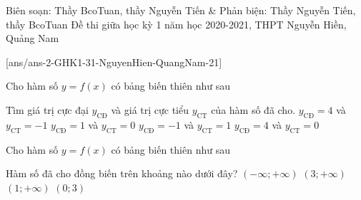 \begin{name}
	{Biên soạn: Thầy BcoTuan, thầy Nguyễn Tiến \& Phản biện: Thầy Nguyễn Tiến, thầy BcoTuan}
	{Đề thi giữa học kỳ 1 năm học 2020-2021, THPT Nguyễn Hiền, Quảng Nam}
\end{name}
\setcounter{ex}{0}\setcounter{bt}{0}
[ans/ans-2-GHK1-31-NguyenHien-QuangNam-21]

\begin{ex}%
	Cho hàm số $y=f(x)$ có bảng biến thiên như sau
	\begin{center}
	\end{center}
	Tìm giá trị cực đại $y_{\text{CĐ}}$ và giá trị cực tiểu $y_{\text{CT}}$ của hàm số đã cho.
	\choice
	{$y_{\text{CĐ}}=4$ và $y_{\text{CT}}=-1$  }
	{$y_{\text{CĐ}}=1$ và $y_{\text{CT}}=0$  }
	{$y_{\text{CĐ}}=-1$ và $y_{\text{CT}}=1$  }
	{\True $y_{\text{CĐ}}=4$ và $y_{\text{CT}}=0$  }
\end{ex}


\begin{ex}%
	Cho hàm số $y=f(x)$ có bảng biến thiên như sau
	\begin{center}
	\end{center}
	Hàm số đã cho đồng biến trên khoảng nào dưới đây?
	\choice
	{$(-\infty;+\infty)$}
	{\True $(3;+\infty)$}
	{$(1;+\infty)$}
	{$(0;3)$}
\end{ex}


